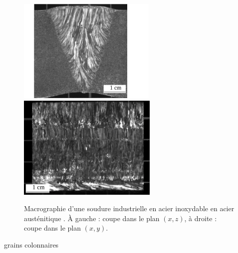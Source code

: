 \begin{figure}
	\includegraphics[height=5cm]{./img/soudure1.png}
	\includegraphics[height=5cm]{./img/soudure2.png}
	\caption{Macrographie d'une soudure industrielle en acier inoxydable en acier austénitique \citep{chassignole}. À gauche : coupe dans le plan $(x,z)$, à droite : coupe dans le plan $(x,y)$.}
\end{figure}

grains colonnaires
